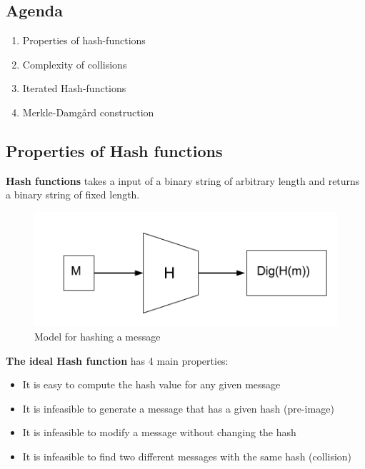 

\subsection*{Agenda}
\begin{enumerate}
\item Properties of hash-functions
\item Complexity of collisions
\item Iterated Hash-functions
\item Merkle-Damgård construction
\end{enumerate}

\subsection{Properties of Hash functions}
\textbf{Hash functions} takes a input of a binary string of arbitrary
length and returns a binary string of fixed length.
\begin{figure}[H]
  \centering
  \includegraphics[scale=0.4]{images/10-hash}
  \caption{Model for hashing a message}
\end{figure}

\textbf{The ideal Hash function} has 4 main properties:
\begin{itemize}
\item It is easy to compute the hash value for any given message
\item It is infeasible to generate a message that has a given hash (pre-image)
\item It is infeasible to modify a message without changing the hash
\item It is infeasible to find two different messages with the same hash (collision)
\end{itemize}

